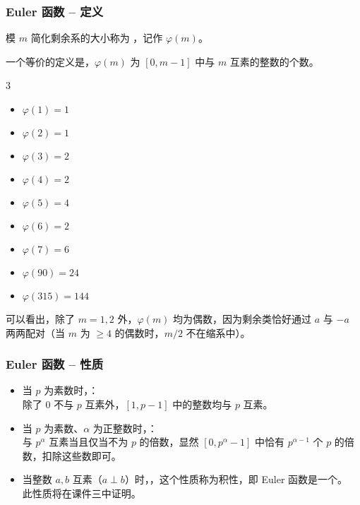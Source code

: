 \documentclass{../pkslide}
\begin{document}
\begin{frame}
  \frametitle{Euler 函数 -- 定义}
  \begin{definition}[Euler 函数]
    模 $m$ 简化剩余系的大小称为 ，记作 $\varphi(m)$。
  \end{definition}
  
  \pause
  一个等价的定义是，$\varphi(m)$ 为 $[0, m - 1]$ 中与 $m$ 互素的整数的个数。
  
  \pause
  \begin{example}[Euler 函数]
    \begin{mymulticols}[l][l]{3}
      \begin{itemize}
        \item $\varphi(1) = 1$
        \item $\varphi(2) = 1$
        \item $\varphi(3) = 2$
        \item $\varphi(4) = 2$
        \item $\varphi(5) = 4$
        \item $\varphi(6) = 2$
        \item $\varphi(7) = 6$
        \item $\varphi(90) = 24$
        \item $\varphi(315) = 144$
      \end{itemize}
    \end{mymulticols}
  \end{example}
  
  可以看出，除了 $m = 1, 2$ 外，$\varphi(m)$ 均为偶数，因为剩余类恰好通过 $a$ 与 $-a$ 两两配对（当 $m$ 为 $\ge 4$ 的偶数时，$m / 2$ 不在缩系中）。
\end{frame}

\begin{frame}
  \frametitle{Euler 函数 -- 性质}
  \begin{itemize}
    \item 当 $p$ 为素数时，：\\
      除了 $0$ 不与 $p$ 互素外，$[1, p - 1]$ 中的整数均与 $p$ 互素。
      \pause
    \item 当 $p$ 为素数、$\alpha$ 为正整数时，：\\
      与 $p^\alpha$ 互素当且仅当不为 $p$ 的倍数，显然 $[0, p^\alpha - 1]$ 中恰有 $p^{\alpha - 1}$ 个 $p$ 的倍数，扣除这些数即可。
      \pause
    \item 当整数 \alert{$a, b$ 互素}（$a \perp b$）时，，这个性质称为积性，即 Euler 函数是一个。\\
      此性质将在课件三中证明。
  \end{itemize}
\end{frame}
\end{document}
